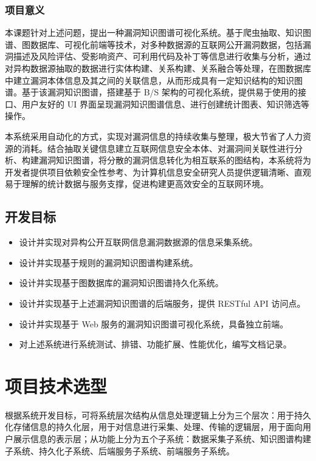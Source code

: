 \documentclass[a4paper,AutoFakeBold,oneside,12pt]{book}
\begin{document}
\subsection{项目意义}

本课题针对上述问题，提出一种漏洞知识图谱可视化系统。基于爬虫抽取、知识图谱、图数据库、可视化前端等技术，对多种数据源的互联网公开漏洞数据，包括漏洞描述及风险评估、受影响资产、可利用代码及补丁等信息进行收集与分析，通过对异构数据源抽取的数据进行实体构建、关系构建、关系融合等处理，在图数据库中建立漏洞本体信息及其之间的关联信息，从而形成具有一定知识结构的知识图谱。基于该漏洞知识图谱，搭建基于 B/S 架构的可视化系统，提供易于使用的接口、用户友好的 UI 界面呈现漏洞知识图谱信息、进行创建统计图表、知识筛选等操作。

本系统采用自动化的方式，实现对漏洞信息的持续收集与整理，极大节省了人力资源的消耗。结合抽取关键信息建立互联网信息安全本体、对漏洞间关联性进行分析、构建漏洞知识图谱，将分散的漏洞信息转化为相互联系的图结构，本系统将为开发者提供项目依赖安全性参考、为计算机信息安全研究人员提供逻辑清晰、直观易于理解的统计数据与服务支撑，促进构建更高效安全的互联网环境。

\section{开发目标}

\begin{itemize}
	\item 设计并实现对异构公开互联网信息漏洞数据源的信息采集系统。
	\item 设计并实现基于规则的漏洞知识图谱构建系统。
	\item 设计并实现基于图数据库的漏洞知识图谱持久化系统。
	\item 设计并实现基于上述漏洞知识图谱的后端服务，提供 RESTful API 访问点。
	\item 设计并实现基于 Web 服务的漏洞知识图谱可视化系统，具备独立前端。
	\item 对上述系统进行系统测试、排错、功能扩展、性能优化，编写文档记录。
\end{itemize}

\chapter{项目技术选型}

根据系统开发目标，可将系统层次结构从信息处理逻辑上分为三个层次：用于持久化存储信息的持久化层，用于对信息进行采集、处理、传输的逻辑层，用于面向用户展示信息的表示层；从功能上分为五个子系统：数据采集子系统、知识图谱构建子系统、持久化子系统、后端服务子系统、前端服务子系统。
\end{document}
